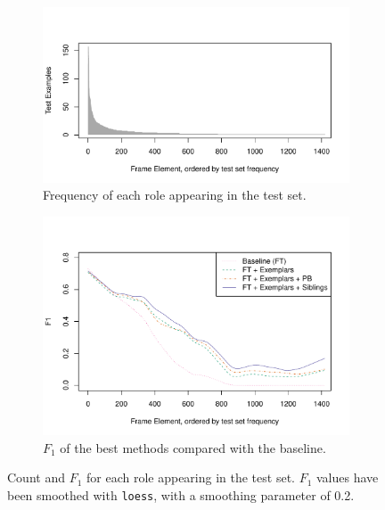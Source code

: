 \documentclass[11pt,a4paper]{article}
\newcommand{\ensuretext}[1]{#1}
\newcommand{\nssmarker}{\ensuretext{\textcolor{magenta}{\ensuremath{^{\textsc{NS}}_{\textsc{S}}}}}}
\newcommand{\arkcomment}[3]{\ensuretext{\textcolor{#3}{[#1 #2]}}}
\newcommand{\nss}[1]{\arkcomment{\nssmarker}{#1}{magenta}}
\newcommand{\finalversion}[1]{}
\begin{document}
\begin{figure}[t]
	\begin{subfigure}[b]{0.5\textwidth}
		\includegraphics[width=\textwidth]{fig/num_instances}
		\caption{Frequency of each role appearing in the test set.}\label{fig:num_inst}
	\end{subfigure}
	\begin{subfigure}[b]{0.5\textwidth}
		\vspace{-1cm}
		\includegraphics[width=\textwidth]{fig/f1_sorted_by_num_instances}
		\caption{$F_1$ of the best methods compared with the baseline.}\label{fig:coolplot}
	\end{subfigure}
	\caption{Count and $F_1$ for each role appearing in the test set. $F_1$ values have been smoothed with \texttt{loess}, with a smoothing parameter of 0.2.}
\end{figure}

\finalversion{\nss{impact of automatic frames?}}
\end{document}
